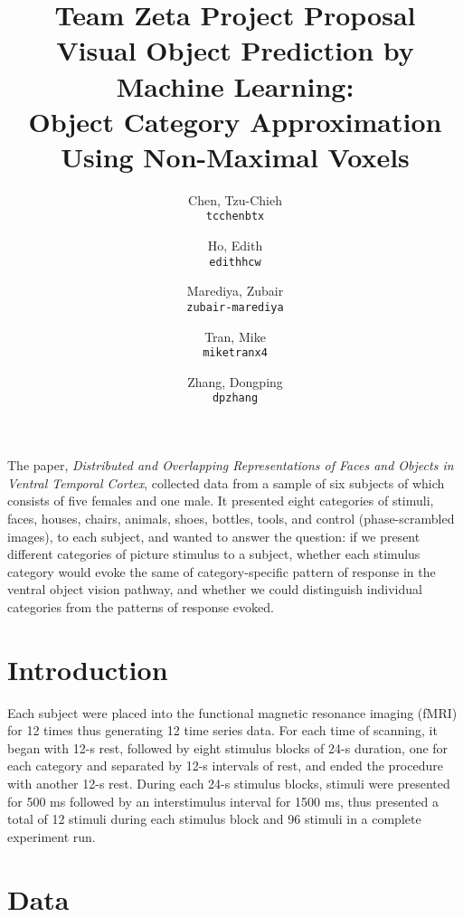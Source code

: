 \documentclass[11pt]{article}
\title{\textbf{Team Zeta Project Proposal}\\
Visual Object Prediction by Machine Learning:\\ 
Object Category Approximation Using Non-Maximal Voxels}
\author{
  Chen, Tzu-Chieh\\
  \texttt{tcchenbtx}
  \and
  Ho, Edith\\
  \texttt{edithhcw}
  \and
  Marediya, Zubair\\
  \texttt{zubair-marediya}
  \and
  Tran, Mike\\
  \texttt{miketranx4}
  \and
  Zhang, Dongping\\
  \texttt{dpzhang}
}
\begin{document}
\maketitle

\abstract{}

The paper, \emph{Distributed and Overlapping Representations of Faces
and Objects in Ventral Temporal Cortex}\cite{object_rec_main}, collected data 
from a sample of six subjects of which consists of five females and one male. 
It presented eight categories of stimuli, faces, houses, chairs, animals, 
shoes, bottles, tools, and control (phase-scrambled images), to each subject, 
and wanted to answer the question: if we present different categories of 
picture stimulus to a subject, whether each stimulus category would evoke the 
same of category-specific pattern of response in the ventral object vision 
pathway, and whether we could distinguish individual categories from the 
patterns of response evoked. \\

\section{Introduction}

Each subject were placed into the functional 
magnetic resonance imaging (fMRI) for 12 times thus generating 12 time series 
data. For each time of scanning, it began with 12-s rest, followed by 
eight stimulus blocks of 24-s duration, one for each category and separated by 
12-s intervals of rest, and ended the procedure with another 12-s rest. During 
each 24-s stimulus blocks, stimuli were presented for 500 ms followed by an 
interstimulus interval for 1500 ms, thus presented a total of 12 stimuli during 
each stimulus block and 96 stimuli in a complete experiment run.\\

\section{Data}
\end{document}
